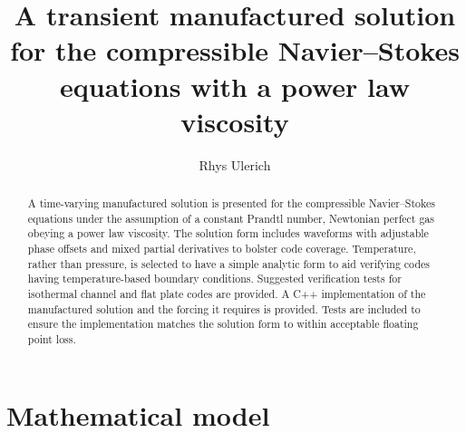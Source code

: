 \documentclass[10pt,reqno]{amsart}
\begin{document}
\title{
    A transient manufactured solution for the compressible Navier--Stokes
    equations with a power law viscosity
}
\author{Rhys Ulerich}

\begin{abstract}
A time-varying manufactured solution is presented for the compressible
Navier--Stokes equations under the assumption of a constant Prandtl number,
Newtonian perfect gas obeying a power law viscosity.  The solution form
includes waveforms with adjustable phase offsets and mixed partial derivatives
to bolster code coverage.  Temperature, rather than pressure, is selected to
have a simple analytic form to aid verifying codes having temperature-based
boundary conditions.  Suggested verification tests for isothermal channel and
flat plate codes are provided.  A C++ implementation of the manufactured
solution and the forcing it requires is provided.  Tests are included to ensure
the implementation matches the solution form to within acceptable floating
point loss.
\end{abstract}

\maketitle

\section{Mathematical model}
\end{document}
